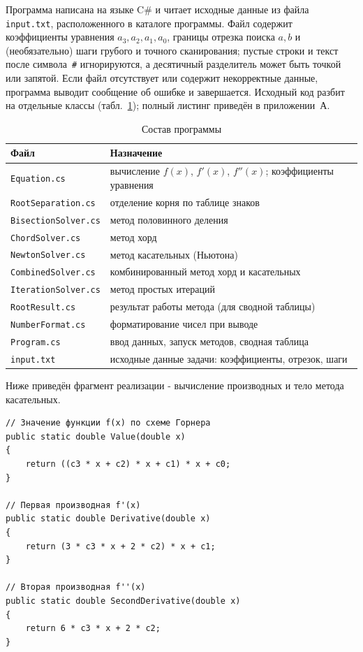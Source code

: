 \documentclass[14pt,a4paper]{extarticle}
\begin{document}
Программа написана на языке C\# и читает исходные данные из файла
\texttt{input.txt}, расположенного в каталоге программы. Файл содержит
коэффициенты уравнения $a_3,a_2,a_1,a_0$, границы отрезка поиска
$a,b$ и (необязательно) шаги грубого и точного сканирования; пустые
строки и текст после символа~\texttt{\#} игнорируются, а десятичный
разделитель может быть точкой или запятой. Если файл отсутствует или
содержит некорректные данные, программа выводит сообщение об ошибке и
завершается. Исходный код разбит на отдельные классы
(табл.~\ref{tab:files}); полный листинг приведён в приложении~А.

\begin{table}[H]
    \centering
    \caption{Состав программы}
    \label{tab:files}
    \begin{tabular}{@{}p{6.2cm}p{8.5cm}@{}}
        \toprule
        Файл & Назначение\\
        \midrule
        \texttt{Equation.cs}          & вычисление $f(x)$, $f'(x)$, $f''(x)$; коэффициенты уравнения\\
        \texttt{RootSeparation.cs}    & отделение корня по таблице знаков\\
        \texttt{BisectionSolver.cs}   & метод половинного деления\\
        \texttt{ChordSolver.cs}       & метод хорд\\
        \texttt{NewtonSolver.cs}      & метод касательных (Ньютона)\\
        \texttt{CombinedSolver.cs}    & комбинированный метод хорд и касательных\\
        \texttt{IterationSolver.cs}   & метод простых итераций\\
        \texttt{RootResult.cs}        & результат работы метода (для сводной таблицы)\\
        \texttt{NumberFormat.cs}      & форматирование чисел при выводе\\
        \texttt{Program.cs}           & ввод данных, запуск методов, сводная таблица\\
        \texttt{input.txt}            & исходные данные задачи: коэффициенты, отрезок, шаги\\
        \bottomrule
    \end{tabular}
\end{table}

Ниже приведён фрагмент реализации - вычисление производных и тело
метода касательных.

\begin{lstlisting}[caption={Производные функции (Equation.cs)}]
// Значение функции f(x) по схеме Горнера
public static double Value(double x)
{
    return ((c3 * x + c2) * x + c1) * x + c0;
}

// Первая производная f'(x)
public static double Derivative(double x)
{
    return (3 * c3 * x + 2 * c2) * x + c1;
}

// Вторая производная f''(x)
public static double SecondDerivative(double x)
{
    return 6 * c3 * x + 2 * c2;
}
\end{lstlisting}
\end{document}
